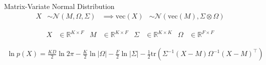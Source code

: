 \documentclass[xcolor=dvipsnames]{beamer}
\newcommand \vecf[1] {
    \text{vec}\left(#1\right)
}
\newcommand \halve[1] {
	\frac{#1}{2}
}
\newcommand \half {
    \halve{1}
}
\newcommand \tr { \text{tr} }
\newcommand \T { ^\top }
\newcommand \nor[2]   { \mathcal{N} \left( {#1}, {#2} \right) }
\newcommand \mnor[3]  { \mathcal{N} \left(#1, #2, #3\right) }
\newcommand \Tr[1]   { \tr \left(  {#1}  \right) }
\newcommand \MReal[2] { { \mathbb{R}^{#1 \times #2} } }
\newcommand \inv[1] { {#1}^{-1} }
\begin{document}

\begin{frame}{Matrix-Variate Normal Distribution}
\begin{align*}
X & \sim \mnor{M}{\Omega}{\Sigma} & \implies \vecf{X} & \sim \nor{\vecf{M}}{\Sigma \otimes \Omega}
\end{align*}


    {\small
        \begin{align*}
        X & \in \MReal{K}{F} &
        M & \in \MReal{K}{F} &
        \Sigma & \in \MReal{K}{K} &
        \Omega & \in \MReal{F}{F}
        \end{align*}
    }



    {\small
        \begin{align*}
        \ln p(X) = \frac{KD}{2}\ln 2\pi - \frac{K}{2}\ln |\Omega| - \frac{F}{2}\ln |\Sigma| -\half \Tr{\inv{\Sigma}(X - M)\inv{\Omega}(X - M)\T}
        \end{align*}
    }


\end{frame}



\end{document}
